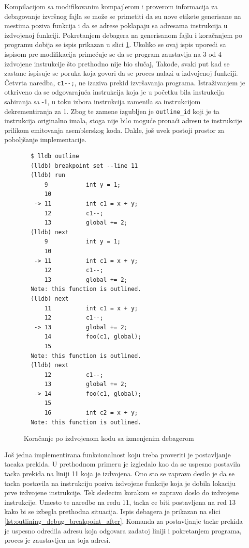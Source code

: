 \documentclass[12pt,oneside]{memoir}
\begin{document}
Kompilacijom sa modifikovanim kompajlerom i proverom informacija za debagovanje izvršnog fajla se može se primetiti da su nove etikete generisane na mestima poziva funkcija i da se adrese poklapaju sa adresama instrukcija u izdvojenoj funkciji.
Pokretanjem debagera na generisanom fajlu i koračanjem po programu dobija se ispis prikazan u slici \ref{lst:outlining_debug_step_after}.
Ukoliko se ovaj ispis uporedi sa ispisom pre modifikacija primećuje se da se program zaustavlja na 3 od 4 izdvojene instrukcije što prethodno nije bio slučaj,
Takođe, svaki put kad se zastane ispisuje se poruka koja govori da se proces nalazi u izdvojenoj funkciji.
Četvrta naredba, \verb|c1--;|, ne izaziva prekid izvršavanja programa.
Istraživanjem je otkriveno da se odgovarajuća instrukcija koja je u početku bila instrukcija sabiranja sa -1, u toku izbora instrukcija zamenila sa instrukcijom dekrementiranja za 1.
Zbog te zamene izgubljen je \verb|outline_id| koji je ta instrukcija originalno imala, stoga nije bilo moguće pronaći adresu te instrukcije prilikom emitovanja asemblerskog koda.
% 
Dakle, još uvek postoji prostor za poboljšanje implementacije.

\begin{figure}[!ht]
\begin{verbatim}
  $ lldb outline
  (lldb) breakpoint set --line 11
  (lldb) run
      9           int y = 1;
      10          
   -> 11          int c1 = x + y;
      12          c1--;
      13          global += 2;
  (lldb) next
      9           int y = 1;
      10          
   -> 11          int c1 = x + y;
      12          c1--;
      13          global += 2;
  Note: this function is outlined.
  (lldb) next
      11          int c1 = x + y;
      12          c1--;
   -> 13          global += 2;
      14          foo(c1, global);
      15          
  Note: this function is outlined.
  (lldb) next
      12          c1--;
      13          global += 2;
   -> 14          foo(c1, global);
      15          
      16          int c2 = x + y;
  Note: this function is outlined.
\end{verbatim}
\caption{Koračanje po izdvojenom kodu sa izmenjenim debagerom}
\label{lst:outlining_debug_step_after}
\end{figure}

Još jedna implementirana funkcionalnost koju treba proveriti je postavljanje tacaka prekida.
U prethodnom primeru je izgledalo kao da se uspesno postavila tacka prekida na liniji 11 koja je izdvojena.
Ono sto se zapravo desilo je da se tacka postavila na instrukciju poziva izdvojene funkcije koja je dobila lokaciju prve izdvojene instrukcije.
Tek sledecim korakom se zapravo doslo do izdvojene instrukcije.
Umesto te naredbe na redu 11, tacka ce biti postavljena na red 13 kako bi se izbegla prethodna situacija.
Ispis debagera je prikazan na slici \ref{lst:outlining_debug_breakpoint_after}.
Komanda za postavljanje tacke prekida je uspesno odredila adresu koja odgovara zadatoj liniji i pokretanjem programa, proces je zaustavljen na toja adresi.
\end{document}
